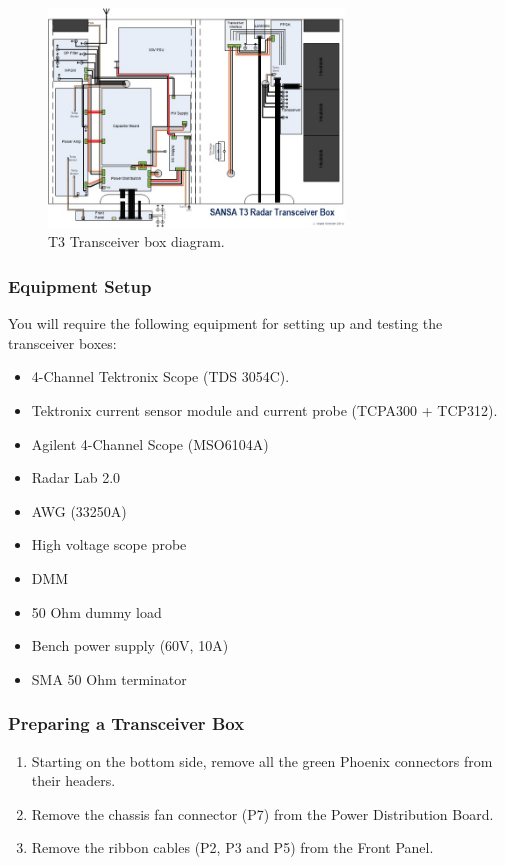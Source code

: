 \begin{figure}[H]
	\centering
	\includegraphics[width=0.7\textwidth]{images/hardware/box_diagram.jpg}
	\caption{T3 Transceiver box diagram.}
	\label{fig:hw_box_diagram}
\end{figure}

\subsubsection{Equipment Setup}

You will require the following equipment for setting up and testing the transceiver boxes:
\begin{itemize}
	\item 4-Channel Tektronix Scope (TDS 3054C).
	\item Tektronix current sensor module and current probe (TCPA300 + TCP312).
	\item Agilent 4-Channel Scope (MSO6104A)
	\item Radar Lab 2.0
	\item	AWG (33250A)
	\item	High voltage scope probe
	\item	DMM
	\item	50 Ohm dummy load
	\item	Bench power supply (60V, 10A)
	\item	SMA 50 Ohm terminator
\end{itemize}

\subsubsection{Preparing a Transceiver Box}

\begin{enumerate}
	\item Starting on the bottom side, remove all the green Phoenix connectors from their headers.
	\item Remove the chassis fan connector (P7) from the Power Distribution Board.
	\item Remove the ribbon cables (P2, P3 and P5) from the Front Panel.
\end{enumerate}

